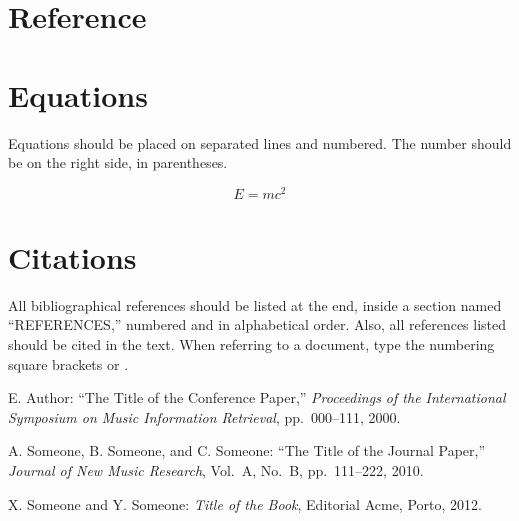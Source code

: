 \documentclass{article}
\begin{document}
\section{Reference}



\section{Equations}

Equations should be placed on separated lines and numbered.
The number should be on the right side, in parentheses.

\begin{equation}
E=mc^{2}
\end{equation}

\section{Citations}

All bibliographical references should be listed at the end,
inside a section named ``REFERENCES,'' numbered and in alphabetical order.
Also, all references listed should be cited in the text.
When referring to a document, type the numbering square brackets
\cite{Author:00} or \cite{Author:00,Someone:10,Someone:04}.

\begin{thebibliography}{citations}

E. Author:
``The Title of the Conference Paper,''
{\it Proceedings of the International Symposium
on Music Information Retrieval}, pp.~000--111, 2000.

A. Someone, B. Someone, and C. Someone:
``The Title of the Journal Paper,''
{\it Journal of New Music Research},
Vol.~A, No.~B, pp.~111--222, 2010.

 X. Someone and Y. Someone: {\it Title of the Book},
    Editorial Acme, Porto, 2012.

\end{thebibliography}

%
\end{document}
